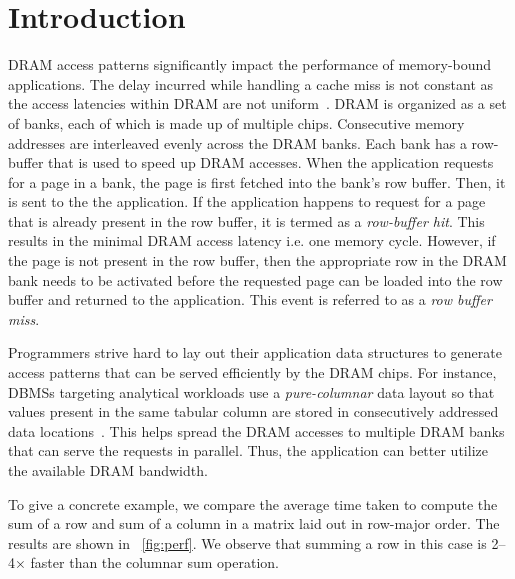 \documentclass[letterpaper]{article}
\begin{document}
\section{Introduction}

DRAM access patterns significantly impact the performance of memory-bound
applications. The delay incurred while handling a cache miss is not
constant as the access latencies within DRAM are not uniform~\cite{dram1}.
DRAM is organized as a set of banks, each of which is made up of multiple
chips. Consecutive memory addresses are interleaved evenly across the
DRAM banks. Each bank has a row-buffer that is used to speed up DRAM
accesses. When the application requests for a page in a bank, the page
is first fetched into the bank's row buffer. Then, it is sent to the
the application. If the application happens to request for a page that
is already present in the row buffer, it is termed as a \textit{row-buffer
hit}. This results in the minimal DRAM access latency i.e. one memory
cycle.
However, if the page is not present in the row buffer, then the appropriate row
in the DRAM bank needs to be activated before the requested page can be loaded into
the row buffer and returned to the application. This event is referred to as a
\textit{row buffer miss}.

Programmers strive hard to lay out their application data structures
to generate access patterns that can be served efficiently by the DRAM chips.
For instance, DBMSs targeting analytical workloads use a \textit{pure-columnar}
data layout so that values present in the same tabular column are stored
in consecutively addressed data locations~\cite{col1,raman13,ailamaki02}. This
helps spread the DRAM accesses to multiple DRAM banks that can serve the requests in
parallel. Thus, the application can better utilize the available DRAM
bandwidth.

To give a concrete example, we compare the average time taken to compute the
sum of a row and sum of a column in a matrix laid out in row-major order.
The results are shown in ~\cref{fig:perf}.
We observe that summing a row in this case is 2--4$\times$ faster than the
columnar sum operation.
\end{document}
